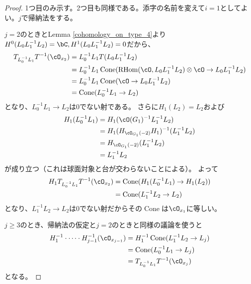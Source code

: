 \documentclass[uplatex, a4paper, dvipdfmx]{jsarticle}
\theoremstyle{definition}
\DeclareMathOperator{\Cone}{\mathrm{Cone}}
\DeclareMathOperator{\RHom}{\mathrm{RHom}}
\begin{document}
\begin{proof}
    1つ目のみ示す。2つ目も同様である。添字の名前を変えて$i=1$としてよい。$j$で帰納法をする。

    $j=2$のとき\cite[Theorem 2.2]{MR2025266}とLemma \ref{cohomology_on_type_4}より$H^0(L_0L_1^{-1}L_2) = \bC, H^1(L_0L_1^{-1}L_2) = 0$だから、
    \begin{align}
        T_{L_0^{-1}L_1}T^{-1}(\cO_{x_2}) & =L_0^{-1}L_1T(L_0L_1^{-1}L_2)                                               \\
                                         & =L_0^{-1}L_1 \Cone(\RHom(\cO, L_0L_1^{-1}L_2)\otimes\cO \to L_0L_1^{-1}L_2) \\
                                         & =L_0^{-1}L_1 \Cone(\cO \to L_0L_1^{-1}L_2)                                  \\
                                         & = \Cone(L_0^{-1}L_1 \to L_2)
    \end{align}
    となり、$L_0^{-1}L_1 \to L_2$は$0$でない射である。
    さらに$H_1(L_2) = L_2$および
    \begin{align}
        H_1(L_0^{-1}L_1) & = H_1 (\cO(G_1)^{-1}L_1^{-1}L_2)             \\
                         & =H_1(H_{\cO_{G_1}(-2)}H_1)^{-1}(L_1^{-1}L_2) \\
                         & =H_{\cO_{G_1}(-2)}(L_1^{-1}L_2)              \\
                         & =L_1^{-1}L_2
    \end{align}
    が成り立つ（これは球面対象と台が交わらないことによる）。
    よって\begin{align}
        H_1T_{L_0^{-1}L_1}T^{-1}(\cO_{x_2}) & = \Cone(H_1(L_0^{-1}L_1) \to H_1(L_2)) \\
                                            & =\Cone(L_1^{-1}L_2 \to L_2)
    \end{align}
    となり、$L_1^{-1}L_2 \to L_2$は$0$でない射だからその$\Cone$は$\cO_{x_1}$に等しい。

    $j \geq 3$のとき、帰納法の仮定と$j=2$のときと同様の議論を使うと
    \begin{align}
        H_1^{-1}\cdot\cdots \cdot H_{j-1}^{-1}(\cO_{x_{j-1}}) & = H_1^{-1}\Cone(L_{1}^{-1}L_2 \to L_j) \\
                                                              & =\Cone(L_{0}^{-1}L_1 \to L_j)          \\
                                                              & =T_{L_0^{-1}L_1}T^{-1}(\cO_{x_j})
    \end{align}
    となる。
\end{proof}
\end{document}
